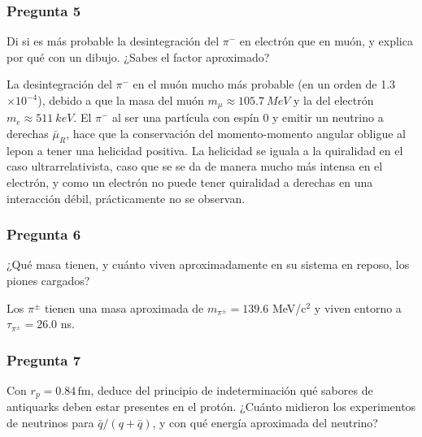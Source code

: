 \vspace*{2em}

\begin{Enunciado}
	\subsubsection*{Pregunta 5}

	Di si es más probable la desintegración del $\pi^-$ en electrón que en muón, y explica por qué con un dibujo. ¿Sabes el factor aproximado?

\end{Enunciado}

La desintegración del $\pi^-$ en el muón mucho más probable (en un orden de 1.3$\times 10^{-4}$), debido a que la masa del muón $m_\mu\approx \SI{105.7}{MeV}$ y la del electrón $m_e\approx \SI{511}{keV}$. El $\pi^-$ al ser una partícula con espín 0 y emitir un neutrino a derechas $\bar{\mu}_R$, hace que la conservación del momento-momento angular  obligue al lepon a tener una helicidad positiva. La helicidad se iguala a la quiralidad en el caso ultrarrelativista, caso que se se da de manera mucho más intensa en el electrón, y como un electrón no puede tener quiralidad a derechas en una interacción débil, prácticamente no se observan.


\vspace*{2em}

\begin{Enunciado}
	\subsubsection*{Pregunta 6}

	¿Qué masa tienen, y cuánto viven aproximadamente en su sistema en reposo, los piones cargados?

\end{Enunciado}

Los $\pi^{\pm}$ tienen una masa aproximada de $m_{\pi^{\pm}}=139.6$ MeV/c$^2$ y viven entorno a $\tau_{\pi^{\pm}}=$26.0 ns.

\vspace*{2em}

\begin{Enunciado}
	\subsubsection*{Pregunta 7}

	Con $r_p = 0.84\,\mathrm{fm}$, deduce del principio de indeterminación qué sabores de antiquarks deben estar presentes en el protón. ¿Cuánto midieron los experimentos de neutrinos para $\bar{q}/(q + \bar{q})$, y con qué energía aproximada del neutrino?

\end{Enunciado}

